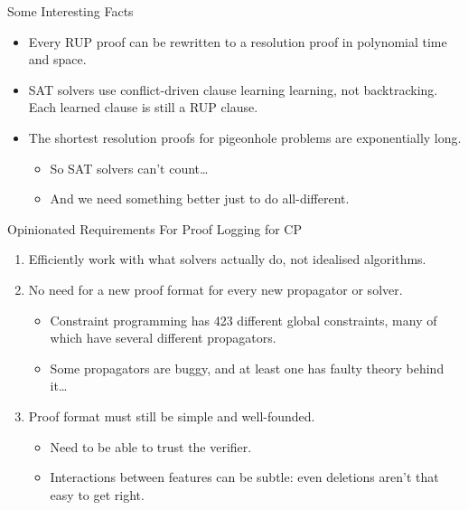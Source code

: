 \documentclass{beamer}
\begin{document}
\begin{frame}{Some Interesting Facts}
    \begin{itemize}
        \item Every RUP proof can be rewritten to a resolution proof in polynomial time and space.
        \item SAT solvers use conflict-driven clause learning learning, not backtracking. Each
            learned clause is still a RUP clause.
        \item The shortest resolution proofs for pigeonhole problems are exponentially long.
            \begin{itemize}
                \item <2-> So SAT solvers can't count\ldots
                \item <2-> And we need something better just to do all-different.
            \end{itemize}
    \end{itemize}
\end{frame}

\begin{frame}{Opinionated Requirements For Proof Logging for CP}
    \begin{enumerate}
        \item Efficiently work with what solvers actually do, not idealised algorithms. \pause
        \item No need for a new proof format for every new propagator or solver.
            \begin{itemize}
                \item Constraint programming has 423 different global constraints, many of which
                    have several different propagators.
                \item Some propagators are buggy, and at least one has faulty theory behind it\ldots
            \end{itemize} \pause
        \item Proof format must still be simple and well-founded.
            \begin{itemize}
                \item Need to be able to trust the verifier.
                \item Interactions between features can be subtle: even deletions aren't that easy
                    to get right.
            \end{itemize}
    \end{enumerate}
\end{frame}
\end{document}
